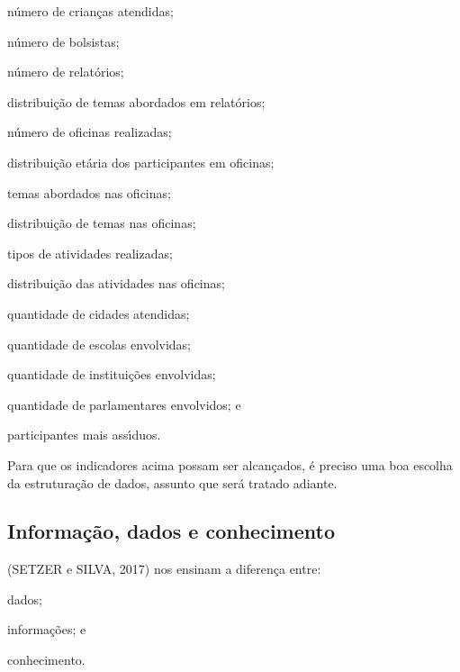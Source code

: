 \documentclass[
12pt,		%
openright,	%
twoside,  %
a4paper,			%
chapter=TITLE,		%
english,			%
french,				%
spanish,			%
brazil				%
]{USPSC-classe/USPSC}
\begin{document}
\begin{alineas}
\item n\'umero de crian\c{c}as atendidas;
\item n\'umero de bolsistas;
\item n\'umero de relat\'orios;
\item distribui\c{c}\~ao de temas abordados em relat\'orios;
\item n\'umero de oficinas realizadas;
\item distribui\c{c}\~ao et\'aria dos participantes em oficinas;
\item temas abordados nas oficinas;
\item distribui\c{c}\~ao de temas nas oficinas;
\item tipos de atividades realizadas;
\item distribui\c{c}\~ao das atividades nas oficinas;
\item quantidade de cidades atendidas;
\item quantidade de escolas envolvidas;
\item quantidade de institui\c{c}\~oes envolvidas;
\item quantidade de parlamentares envolvidos; e
\item participantes mais ass\'{\i}duos.
\end{alineas}

Para que os indicadores acima possam ser alcan\c{c}ados, \'e preciso uma boa escolha da estrutura\c{c}\~ao de dados, assunto que ser\'a tratado adiante.









\subsection[Informa\c{c}\~ao, dados e conhecimento]{Informa\c{c}\~ao, dados e conhecimento}\label{Informa\c{c}\~ao, dados e conhecimento}
(SETZER e SILVA, 2017)  nos ensinam a diferen\c{c}a entre:










\begin{alineas}
\item dados;
\item informa\c{c}\~oes; e
\item conhecimento.
\end{alineas}
\end{document}
